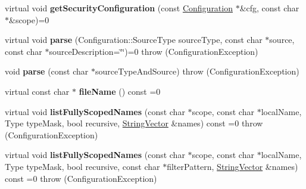 \begin{DoxyCompactItemize}
\item 
\hypertarget{classCONFIG4CPP__NAMESPACE_1_1Configuration_a80dbde63ed753da122a831adf4c34f4d}{virtual void {\bfseries get\-Security\-Configuration} (const \hyperlink{classCONFIG4CPP__NAMESPACE_1_1Configuration}{Configuration} $\ast$\&cfg, const char $\ast$\&scope)=0}\label{classCONFIG4CPP__NAMESPACE_1_1Configuration_a80dbde63ed753da122a831adf4c34f4d}

\item 
\hypertarget{classCONFIG4CPP__NAMESPACE_1_1Configuration_a9962e8e2d624ff8b4ddf688098d876ca}{virtual void {\bfseries parse} (Configuration\-::\-Source\-Type source\-Type, const char $\ast$source, const char $\ast$source\-Description=\char`\"{}\char`\"{})=0  throw (\-Configuration\-Exception)}\label{classCONFIG4CPP__NAMESPACE_1_1Configuration_a9962e8e2d624ff8b4ddf688098d876ca}

\item 
\hypertarget{classCONFIG4CPP__NAMESPACE_1_1Configuration_a879e4483675830ae4210eaa906ad9d6c}{void {\bfseries parse} (const char $\ast$source\-Type\-And\-Source)  throw (\-Configuration\-Exception)}\label{classCONFIG4CPP__NAMESPACE_1_1Configuration_a879e4483675830ae4210eaa906ad9d6c}

\item 
\hypertarget{classCONFIG4CPP__NAMESPACE_1_1Configuration_a1606e08d467c38e549800710a385ab30}{virtual const char $\ast$ {\bfseries file\-Name} () const =0}\label{classCONFIG4CPP__NAMESPACE_1_1Configuration_a1606e08d467c38e549800710a385ab30}

\item 
\hypertarget{classCONFIG4CPP__NAMESPACE_1_1Configuration_adfb6ac40fe1cfd06383bc54a7c82e69b}{virtual void {\bfseries list\-Fully\-Scoped\-Names} (const char $\ast$scope, const char $\ast$local\-Name, Type type\-Mask, bool recursive, \hyperlink{classCONFIG4CPP__NAMESPACE_1_1StringVector}{String\-Vector} \&names) const =0  throw (\-Configuration\-Exception)}\label{classCONFIG4CPP__NAMESPACE_1_1Configuration_adfb6ac40fe1cfd06383bc54a7c82e69b}

\item 
\hypertarget{classCONFIG4CPP__NAMESPACE_1_1Configuration_a925700c23182f453b1913184b87db859}{virtual void {\bfseries list\-Fully\-Scoped\-Names} (const char $\ast$scope, const char $\ast$local\-Name, Type type\-Mask, bool recursive, const char $\ast$filter\-Pattern, \hyperlink{classCONFIG4CPP__NAMESPACE_1_1StringVector}{String\-Vector} \&names) const =0  throw (\-Configuration\-Exception)}\label{classCONFIG4CPP__NAMESPACE_1_1Configuration_a925700c23182f453b1913184b87db859}


\end{DoxyCompactItemize}

